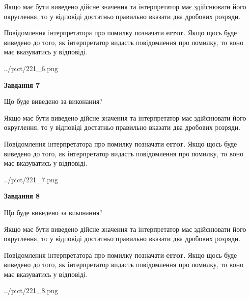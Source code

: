 \documentclass[12pt, ukrainian]{article}
\begin{document}
{\begin {Large}
Якщо має бути виведено дійсне значення та інтерпретатор має здійснювати його округлення, 
то у відповіді достатньо правильно вказати два дробових розряди.

Повідомлення інтерпретатора про помилку позначати \textbf{error}.
Якщо щось буде виведено до того, як інтерпретатор видасть повідомлення про помилку, 
то воно має вказуватись у відповіді. \par

\begin{center}
	{../pict/221_6.png}
\end{center}
\newpage

{\begin {center}\textbf{Завдання 7}\end {center}}\par
Що буде виведено за виконання? \par

Якщо має бути виведено дійсне значення та інтерпретатор має здійснювати його округлення, 
то у відповіді достатньо правильно вказати два дробових розряди.

Повідомлення інтерпретатора про помилку позначати \textbf{error}.
Якщо щось буде виведено до того, як інтерпретатор видасть повідомлення про помилку, 
то воно має вказуватись у відповіді. \par

\begin{center}
	{../pict/221_7.png}
\end{center}
\newpage

{\begin {center}\textbf{Завдання 8}\end {center}}\par
Що буде виведено за виконання? \par

Якщо має бути виведено дійсне значення та інтерпретатор має здійснювати його округлення, 
то у відповіді достатньо правильно вказати два дробових розряди.

Повідомлення інтерпретатора про помилку позначати \textbf{error}.
Якщо щось буде виведено до того, як інтерпретатор видасть повідомлення про помилку, 
то воно має вказуватись у відповіді. \par

\begin{center}
	{../pict/221_8.png}
\end{center}
\newpage


\end{Large}}
\end{document}
